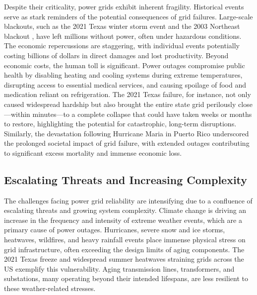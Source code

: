 \documentclass[10pt,twocolumn,letterpaper]{article}
\begin{document}
Despite their criticality, power grids exhibit inherent fragility. Historical events serve as stark reminders of the potential consequences of grid failures. Large-scale blackouts, such as the 2021 Texas winter storm event \cite{number8} 
and the 2003 Northeast blackout \cite{number10}, 
have left millions without power, often under hazardous conditions. The economic repercussions are staggering, with individual events potentially costing billions of dollars in direct damages and lost productivity. \cite{number1} 
Beyond economic costs, the human toll is significant. Power outages compromise public health by disabling heating and cooling systems during extreme temperatures, disrupting access to essential medical services, and causing spoilage of food and medication reliant on refrigeration. \cite{number1} 
The 2021 Texas failure, for instance, not only caused widespread hardship but also brought the entire state grid perilously close—within minutes—to a complete collapse that could have taken weeks or months to restore, highlighting the potential for catastrophic, long-term disruptions. \cite{number8} 
Similarly, the devastation following Hurricane Maria in Puerto Rico underscored the prolonged societal impact of grid failure, with extended outages contributing to significant excess mortality and immense economic loss. \cite{number10} 

\subsection{Escalating Threats and Increasing Complexity}

The challenges facing power grid reliability are intensifying due to a confluence of escalating threats and growing system complexity. Climate change is driving an increase in the frequency and intensity of extreme weather events, which are a primary cause of power outages. \cite{number9} 
Hurricanes, severe snow and ice storms, heatwaves, wildfires, and heavy rainfall events place immense physical stress on grid infrastructure, often exceeding the design limits of aging components. \cite{number1} 
The 2021 Texas freeze \cite{number8} 
and widespread summer heatwaves straining grids across the US \cite{number10} 
exemplify this vulnerability. Aging transmission lines, transformers, and substations, many operating beyond their intended lifespans, are less resilient to these weather-related stresses. \cite{number1} 
\end{document}
